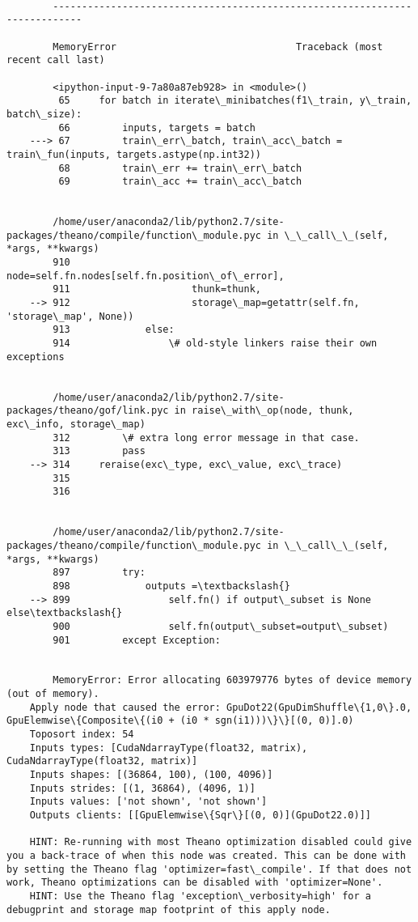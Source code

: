 \documentclass{article}
\begin{document}
    \begin{Verbatim}[commandchars=\\\{\}]

        ---------------------------------------------------------------------------

        MemoryError                               Traceback (most recent call last)

        <ipython-input-9-7a80a87eb928> in <module>()
         65     for batch in iterate\_minibatches(f1\_train, y\_train, batch\_size):
         66         inputs, targets = batch
    ---> 67         train\_err\_batch, train\_acc\_batch = train\_fun(inputs, targets.astype(np.int32))
         68         train\_err += train\_err\_batch
         69         train\_acc += train\_acc\_batch
    

        /home/user/anaconda2/lib/python2.7/site-packages/theano/compile/function\_module.pyc in \_\_call\_\_(self, *args, **kwargs)
        910                     node=self.fn.nodes[self.fn.position\_of\_error],
        911                     thunk=thunk,
    --> 912                     storage\_map=getattr(self.fn, 'storage\_map', None))
        913             else:
        914                 \# old-style linkers raise their own exceptions
    

        /home/user/anaconda2/lib/python2.7/site-packages/theano/gof/link.pyc in raise\_with\_op(node, thunk, exc\_info, storage\_map)
        312         \# extra long error message in that case.
        313         pass
    --> 314     reraise(exc\_type, exc\_value, exc\_trace)
        315 
        316 
    

        /home/user/anaconda2/lib/python2.7/site-packages/theano/compile/function\_module.pyc in \_\_call\_\_(self, *args, **kwargs)
        897         try:
        898             outputs =\textbackslash{}
    --> 899                 self.fn() if output\_subset is None else\textbackslash{}
        900                 self.fn(output\_subset=output\_subset)
        901         except Exception:
    

        MemoryError: Error allocating 603979776 bytes of device memory (out of memory).
    Apply node that caused the error: GpuDot22(GpuDimShuffle\{1,0\}.0, GpuElemwise\{Composite\{(i0 + (i0 * sgn(i1)))\}\}[(0, 0)].0)
    Toposort index: 54
    Inputs types: [CudaNdarrayType(float32, matrix), CudaNdarrayType(float32, matrix)]
    Inputs shapes: [(36864, 100), (100, 4096)]
    Inputs strides: [(1, 36864), (4096, 1)]
    Inputs values: ['not shown', 'not shown']
    Outputs clients: [[GpuElemwise\{Sqr\}[(0, 0)](GpuDot22.0)]]
    
    HINT: Re-running with most Theano optimization disabled could give you a back-trace of when this node was created. This can be done with by setting the Theano flag 'optimizer=fast\_compile'. If that does not work, Theano optimizations can be disabled with 'optimizer=None'.
    HINT: Use the Theano flag 'exception\_verbosity=high' for a debugprint and storage map footprint of this apply node.

    \end{Verbatim}
\end{document}

